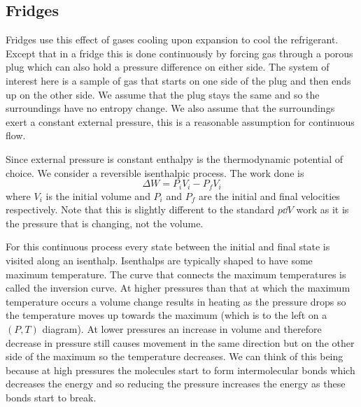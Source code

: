 \documentclass[a4paper]{article}
\begin{document}
    \subsection{Fridges}
    Fridges use this effect of gases cooling upon expansion to cool the refrigerant.
    Except that in a fridge this is done continuously by forcing gas through a porous plug which can also hold a pressure difference on either side.
    The system of interest here is a sample of gas that starts on one side of the plug and then ends up on the other side.
    We assume that the plug stays the same and so the surroundings have no entropy change.
    We also assume that the surroundings exert a constant external pressure, this is a reasonable assumption for continuous flow.
    
    Since external pressure is constant enthalpy is the thermodynamic potential of choice.
    We consider a reversible isenthalpic process.
    The work done is
    \[\Delta W = P_iV_i - P_fV_i\]
    where \(V_i\) is the initial volume and \(P_i\) and \(P_f\) are the initial and final velocities respectively.
    Note that this is slightly different to the standard \(p\dd{V}\) work as it is the pressure that is changing, not the volume.
    
    For this continuous process every state between the initial and final state is visited along an isenthalp.
    Isenthalps are typically shaped to have some maximum temperature.
    The curve that connects the maximum temperatures is called the inversion curve.
    At higher pressures than that at which the maximum temperature occurs a volume change results in heating as the pressure drops so the temperature moves up towards the maximum (which is to the left on a \((P, T)\) diagram).
    At lower pressures an increase in volume and therefore decrease in pressure still causes movement in the same direction but on the other side of the maximum so the temperature decreases.
    We can think of this being because at high pressures the molecules start to form intermolecular bonds which decreases the energy and so reducing the pressure increases the energy as these bonds start to break.
    
\end{document}
